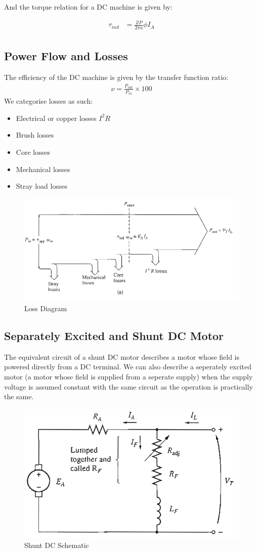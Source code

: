 \documentclass{book}
\begin{document}
And the torque relation for a DC machine is given by:

\begin{align*}
	\tau_{ind} &= \frac{ZP}{2 \pi a} \phi I_A \\
\end{align*}

\subsection{Power Flow and Losses}

The efficiency of the DC machine is given by the transfer function ratio:
\begin{align*}
	\nu = \frac{P_{out}}{P_{in}}\times 100 
\end{align*}
We categorise losses as such:

\begin{itemize}
	\item Electrical or copper losses $I^2R$ 
	\item Brush losses
	\item Core losses
	\item Mechanical losses
	\item Stray load losses
\end{itemize}

\begin{figure}[h]
	\centering
	\includegraphics[width=0.4\linewidth]{Screenshots/power_diagram}
	\caption{Loss Diagram}
	\label{fig:powerdiagram}
\end{figure}

\subsection{Separately Excited and Shunt DC Motor}

The equivalent circuit of a shunt DC motor describes a motor whose field is powered directly from a DC terminal. We can also describe a seperately excited motor (a motor whose field is supplied from a seperate supply) when the supply voltage is assumed constant with the same circuit as the operation is practically the same.

\begin{figure}[h]
	\centering
	\includegraphics[width=0.5\linewidth]{Screenshots/equivalent_motor_circuit1}
	\caption{Shunt DC Schematic}
	\label{fig:equivalentmotorcircuit1}
\end{figure}
\end{document}
